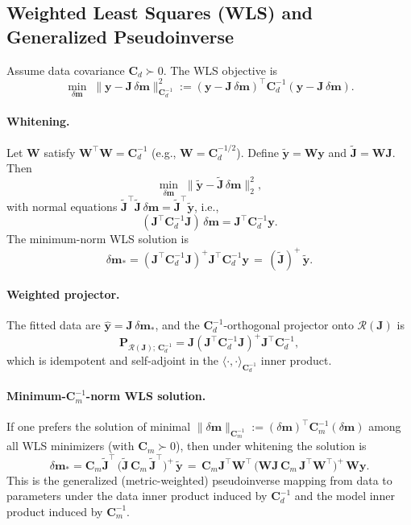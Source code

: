 \subsection{Weighted Least Squares (WLS) and Generalized Pseudoinverse}\label{subsec:wls}
Assume data covariance $\mathbf{C}_d \succ 0$. The WLS objective is
\[
\min_{\delta\mathbf{m}}\; \|\mathbf{y}-\mathbf{J}\,\delta\mathbf{m}\|_{\mathbf{C}_d^{-1}}^2 := (\mathbf{y}-\mathbf{J}\,\delta\mathbf{m})^\top \mathbf{C}_d^{-1} (\mathbf{y}-\mathbf{J}\,\delta\mathbf{m}).
\]
\paragraph{Whitening.} Let $\mathbf{W}$ satisfy $\mathbf{W}^\top\mathbf{W}=\mathbf{C}_d^{-1}$ (e.g., $\mathbf{W}=\mathbf{C}_d^{-1/2}$). Define $\tilde{\mathbf{y}}=\mathbf{W}\mathbf{y}$ and $\tilde{\mathbf{J}}=\mathbf{W}\mathbf{J}$. Then
\[
\min_{\delta\mathbf{m}} \; \|\tilde{\mathbf{y}}-\tilde{\mathbf{J}}\,\delta\mathbf{m}\|_2^2,
\]
with normal equations $\tilde{\mathbf{J}}^\top\tilde{\mathbf{J}}\,\delta\mathbf{m}=\tilde{\mathbf{J}}^\top \tilde{\mathbf{y}}$, i.e.,
\[
(\mathbf{J}^\top \mathbf{C}_d^{-1} \mathbf{J})\,\delta\mathbf{m} = \mathbf{J}^\top \mathbf{C}_d^{-1} \mathbf{y}.
\]
The minimum-norm WLS solution is
\[
\delta\mathbf{m}_\ast = (\mathbf{J}^\top \mathbf{C}_d^{-1} \mathbf{J})^{+} \mathbf{J}^\top \mathbf{C}_d^{-1} \mathbf{y} \,=\, (\tilde{\mathbf{J}})^{+}\,\tilde{\mathbf{y}}.
\]
\paragraph{Weighted projector.} The fitted data are $\widehat{\mathbf{y}}=\mathbf{J}\,\delta\mathbf{m}_\ast$, and the $\mathbf{C}_d^{-1}$-orthogonal projector onto $\mathcal{R}(\mathbf{J})$ is
\[
\mathbf{P}_{\mathcal{R}(\mathbf{J});\,\mathbf{C}_d^{-1}} = \mathbf{J} (\mathbf{J}^\top \mathbf{C}_d^{-1} \mathbf{J})^{+} \mathbf{J}^\top \mathbf{C}_d^{-1},
\]
which is idempotent and self-adjoint in the $\langle\cdot,\cdot\rangle_{\mathbf{C}_d^{-1}}$ inner product.

\paragraph{Minimum-\(\mathbf{C}_m^{-1}\)-norm WLS solution.} If one prefers the solution of minimal $\|\delta\mathbf{m}\|_{\mathbf{C}_m^{-1}} := (\delta\mathbf{m})^\top \mathbf{C}_m^{-1} (\delta\mathbf{m})$ among all WLS minimizers (with $\mathbf{C}_m\succ 0$), then under whitening the solution is
\[
\delta\mathbf{m}_\ast = \mathbf{C}_m \tilde{\mathbf{J}}^\top\,\big(\tilde{\mathbf{J}}\,\mathbf{C}_m\,\tilde{\mathbf{J}}^\top\big)^{+}\,\tilde{\mathbf{y}} \,=\, \mathbf{C}_m \mathbf{J}^\top \mathbf{W}^\top\,\big(\mathbf{W}\mathbf{J}\,\mathbf{C}_m\,\mathbf{J}^\top\mathbf{W}^\top\big)^{+}\,\mathbf{W}\mathbf{y}.
\]
This is the generalized (metric-weighted) pseudoinverse mapping from data to parameters under the data inner product induced by $\mathbf{C}_d^{-1}$ and the model inner product induced by $\mathbf{C}_m^{-1}$.

